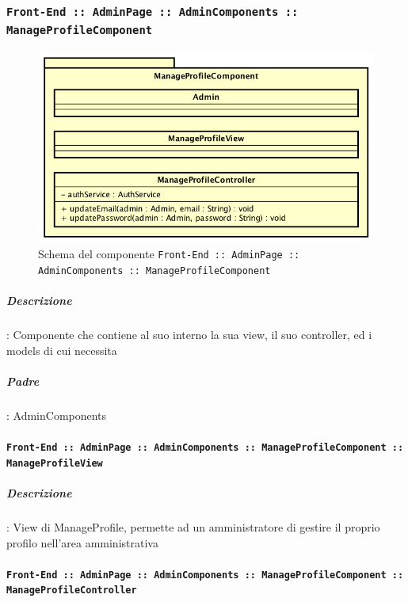 \documentclass[../DefinizioneDiProdotto_v3.0.0.tex]{subfiles}
\begin{document}
	\subsubsection{\texttt{Front-End :: AdminPage :: AdminComponents :: ManageProfileComponent}}
	\begin{figure}[!h]
		\centering
		\includegraphics[scale=0.7]{Architettura/Front-End/AdminPage/AdminComponents/ManageProfileComponent.png}
		\caption{Schema del componente \texttt{Front-End :: AdminPage :: AdminComponents :: ManageProfileComponent}}
	\end{figure}
			\subparagraph{Descrizione}: Componente che contiene al suo interno la sua view, il suo controller, ed i models di cui necessita
			\subparagraph{Padre}: AdminComponents
				\paragraph{\texttt{Front-End :: AdminPage :: AdminComponents :: ManageProfileComponent :: ManageProfileView}}
					\subparagraph{Descrizione}: View di ManageProfile, permette ad un amministratore di gestire il proprio profilo nell'area amministrativa
				\paragraph{\texttt{Front-End :: AdminPage :: AdminComponents :: ManageProfileComponent :: ManageProfileController}}
\end{document}
